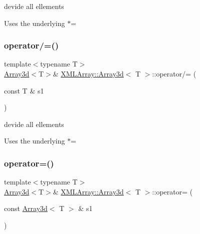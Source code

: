 devide all ellements 

Uses the underlying $\ast$= \mbox{\label{classXMLArray_1_1Array3d_a28d7fb90e93469c69a1e0bd563967792}} 
\subsubsection{\texorpdfstring{operator/=()}{operator/=()}\hspace{0.1cm}{\footnotesize\ttfamily [4/4]}}
{\footnotesize\ttfamily template$<$typename T$>$ \\
\mbox{\hyperlink{classXMLArray_1_1Array3d}{Array3d}}$<$T$>$\& \mbox{\hyperlink{classXMLArray_1_1Array3d}{X\+M\+L\+Array\+::\+Array3d}}$<$ T $>$\+::operator/= (\begin{DoxyParamCaption}\item[{const T \&}]{s1 }\end{DoxyParamCaption})\hspace{0.3cm}{\ttfamily [inline]}}



devide all ellements 

Uses the underlying $\ast$= \mbox{\label{classXMLArray_1_1Array3d_a797bc6cb731b7e9a8fbe0bf72d87678e}} 
\subsubsection{\texorpdfstring{operator=()}{operator=()}\hspace{0.1cm}{\footnotesize\ttfamily [1/4]}}
{\footnotesize\ttfamily template$<$typename T$>$ \\
\mbox{\hyperlink{classXMLArray_1_1Array3d}{Array3d}}$<$T$>$\& \mbox{\hyperlink{classXMLArray_1_1Array3d}{X\+M\+L\+Array\+::\+Array3d}}$<$ T $>$\+::operator= (\begin{DoxyParamCaption}\item[{const \mbox{\hyperlink{classXMLArray_1_1Array3d}{Array3d}}$<$ T $>$ \&}]{s1 }\end{DoxyParamCaption})\hspace{0.3cm}{\ttfamily [inline]}}



